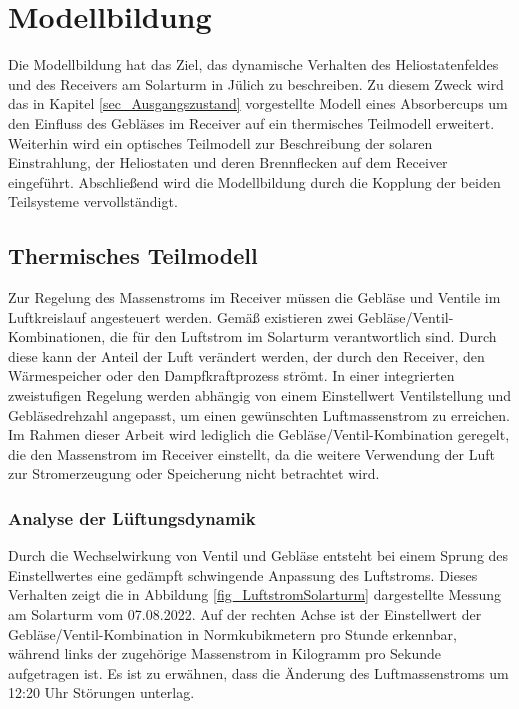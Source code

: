 \chapter{Modellbildung} \label{ch_Modellbildung}
Die Modellbildung hat das Ziel, das dynamische Verhalten des Heliostatenfeldes und des Receivers am Solarturm in Jülich zu beschreiben.
Zu diesem Zweck wird das in Kapitel \ref{sec_Ausgangszustand} vorgestellte Modell eines Absorbercups um den Einfluss des Gebläses im Receiver auf ein thermisches Teilmodell erweitert.
Weiterhin wird ein optisches Teilmodell zur Beschreibung der solaren Einstrahlung, der Heliostaten und deren Brennflecken auf dem Receiver eingeführt.
Abschließend wird die Modellbildung durch die Kopplung der beiden Teilsysteme vervollständigt.

\section{Thermisches Teilmodell} \label{sec_thermischesModell}
Zur Regelung des Massenstroms im Receiver müssen die Gebläse und Ventile im Luftkreislauf angesteuert werden.
Gemäß \cite[S.10ff]{DissGall} existieren zwei Gebläse/Ventil-Kombinationen, die für den Luftstrom im Solarturm verantwortlich sind.
Durch diese kann der Anteil der Luft verändert werden, der durch den Receiver, den Wärmespeicher oder den Dampfkraftprozess strömt.
In einer integrierten zweistufigen Regelung werden abhängig von einem Einstellwert Ventilstellung und Gebläsedrehzahl angepasst, um einen gewünschten Luftmassenstrom zu erreichen.
Im Rahmen dieser Arbeit wird lediglich die Gebläse/Ventil-Kombination geregelt, die den Massenstrom im Receiver einstellt, da die weitere Verwendung der Luft zur Stromerzeugung oder Speicherung nicht betrachtet wird.

\subsection{Analyse der Lüftungsdynamik} \label{subsec_AnalyseLüftungsDyn}
Durch die Wechselwirkung von Ventil und Gebläse entsteht bei einem Sprung des Einstellwertes eine gedämpft schwingende Anpassung des Luftstroms.
Dieses Verhalten zeigt die in Abbildung \ref{fig_LuftstromSolarturm} dargestellte Messung am Solarturm vom 07.08.2022.
Auf der rechten Achse ist der Einstellwert der Gebläse/Ventil-Kombination in Normkubikmetern pro Stunde erkennbar, während links der zugehörige Massenstrom in Kilogramm pro Sekunde aufgetragen ist.
Es ist zu erwähnen, dass die Änderung des Luftmassenstroms um 12:20 Uhr Störungen unterlag. \newpage

